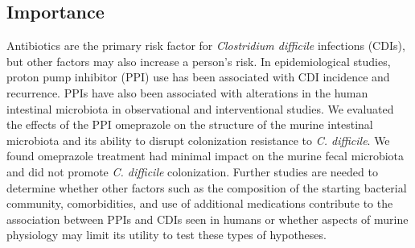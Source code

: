 \documentclass[11pt,]{article}
\begin{document}
\subsection{Importance}\label{importance}

Antibiotics are the primary risk factor for \emph{Clostridium difficile}
infections (CDIs), but other factors may also increase a person's risk.
In epidemiological studies, proton pump inhibitor (PPI) use has been
associated with CDI incidence and recurrence. PPIs have also been
associated with alterations in the human intestinal microbiota in
observational and interventional studies. We evaluated the effects of
the PPI omeprazole on the structure of the murine intestinal microbiota
and its ability to disrupt colonization resistance to \emph{C.
difficile}. We found omeprazole treatment had minimal impact on the
murine fecal microbiota and did not promote \emph{C. difficile}
colonization. Further studies are needed to determine whether other
factors such as the composition of the starting bacterial community,
comorbidities, and use of additional medications contribute to the
association between PPIs and CDIs seen in humans or whether aspects of
murine physiology may limit its utility to test these types of
hypotheses.

\newpage
\end{document}
